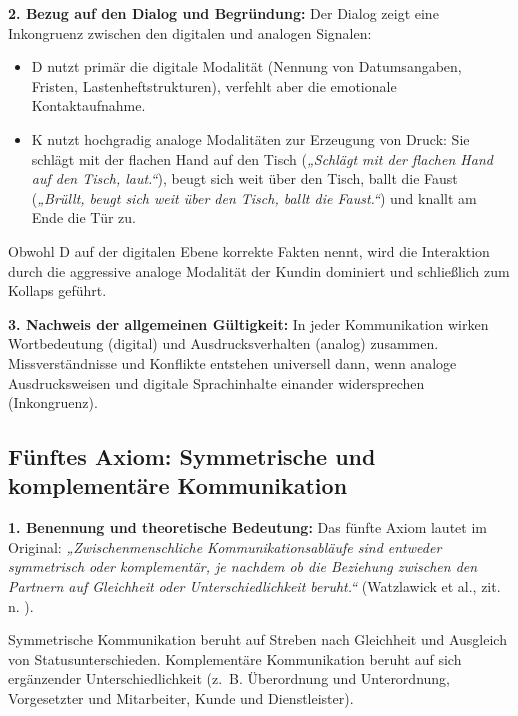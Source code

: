 \textbf{2. Bezug auf den Dialog und Begründung:}
Der Dialog zeigt eine Inkongruenz zwischen den digitalen und analogen Signalen:
\begin{itemize}
    \item D nutzt primär die digitale Modalität (Nennung von Datumsangaben, Fristen, Lastenheftstrukturen), verfehlt aber die emotionale Kontaktaufnahme.
    \item K nutzt hochgradig analoge Modalitäten zur Erzeugung von Druck: Sie schlägt mit der flachen Hand auf den Tisch (\textit{„Schlägt mit der flachen Hand auf den Tisch, laut.“}), beugt sich weit über den Tisch, ballt die Faust (\textit{„Brüllt, beugt sich weit über den Tisch, ballt die Faust.“}) und knallt am Ende die Tür zu.
\end{itemize}
Obwohl D auf der digitalen Ebene korrekte Fakten nennt, wird die Interaktion durch die aggressive analoge Modalität der Kundin dominiert und schließlich zum Kollaps geführt.

\textbf{3. Nachweis der allgemeinen Gültigkeit:}
In jeder Kommunikation wirken Wortbedeutung (digital) und Ausdrucksverhalten (analog) zusammen. Missverständnisse und Konflikte entstehen universell dann, wenn analoge Ausdrucksweisen und digitale Sprachinhalte einander widersprechen (Inkongruenz).

\subsection{Fünftes Axiom: Symmetrische und komplementäre Kommunikation}

\textbf{1. Benennung und theoretische Bedeutung:}
Das fünfte Axiom lautet im Original: \textit{„Zwischenmenschliche Kommunikationsabläufe sind entweder symmetrisch oder komplementär, je nachdem ob die Beziehung zwischen den Partnern auf Gleichheit oder Unterschiedlichkeit beruht.“} (Watzlawick et al., zit. n. \cite[S.~15]{3}).

Symmetrische Kommunikation beruht auf Streben nach Gleichheit und Ausgleich von Statusunterschieden. Komplementäre Kommunikation beruht auf sich ergänzender Unterschiedlichkeit (z.~B. Überordnung und Unterordnung, Vorgesetzter und Mitarbeiter, Kunde und Dienstleister).

